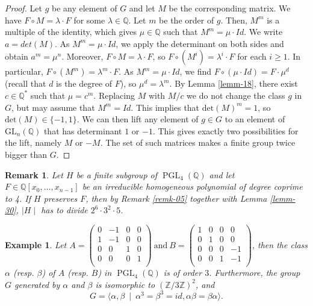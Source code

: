 \documentclass[leqno,12pt]{amsart} %
\newtheorem{rmk}[thm]{Remark}
\newtheorem{ex}[thm]{Example}
\newcommand{\Z}{\ensuremath{\mathbb{Z}}}
\newcommand{\Q}{\ensuremath{\mathbb{Q} }}
\DeclareMathOperator{\PGL}{PGL}
\begin{document}
\begin{proof}
     Let $g$ be any element of $G$ and let $M$ be the corresponding matrix. We have $F\circ M=\lambda\cdot F$ for some  $\lambda\in\Q $. Let $m$ be the order of $g$. Then, $M^m$ is a multiple of the identity, which gives $\mu\in\Q $ such that $M^m=\mu\cdot Id$. We write $a=det(M)$. As $M^m=\mu\cdot Id$, we apply the determinant on both sides and obtain $a^m=\mu^n$. Moreover, $F \circ M=\lambda\cdot F$, so $F\circ (M^i)=\lambda^i \cdot F$ for each $i\ge  1$. In particular, $F\circ (M^m)=\lambda^m\cdot F$. As $M^m=\mu\cdot Id$, we find $F\circ (\mu\cdot Id)=F\cdot\mu^d $ (recall that $d$ is the degree of $F$), so $\mu^d=\lambda^m$. By Lemma \ref{lemm-18}, there exist $c\in\Q^*$ such that $\mu=c^m$. Replacing $M$ with $M/c$ we do not change the class $g$ in $G$, but may assume that $M^m=Id$. This implies that $\mathrm{det}(M)^m=1$, so $\mathrm{det}(M)\in \{-1,1\}$. We can then lift any element of $g \in G$ to an element of $\mathrm{GL}_n(\Q )$ that has determinant $ 1$ or $-1$. This gives exactly two possibilities for the lift, namely $M$ or $-M$. The set of such matrices makes a finite group twice bigger than $G$. 
\end{proof}
\begin{rmk}\label{remk-02} 
 Let $H$ be a finite subgroup of $\PGL _{4}(\Q )$ and let $F\in \Q [x_0,\ldots ,x_{n-1}]$ be an irreducible homogeneous polynomial of degree coprime to 4. If $H$ preserves $F$, then by Remark \ref{remk-05} together with Lemma \ref{lemm-30}, $\mid H\mid $ has to divide $2^6\cdot 3^2\cdot5$.
\end{rmk}
 
\begin{ex}\label{ex-01}
    Let $A=\left(\begin{matrix}
       0&-1 &0&0 \\
         1& -1 &0&0 \\
0& 0 &1&0 \\
0& 0 &0&1 \\
    \end{matrix}\right) \mathrm{~and~}B=\left(\begin{matrix}
       1&0 &0&0 \\
         0& 1 &0&0 \\
          0& 0 &0&-1 \\
          0& 0 &1&-1 \\ 
    \end{matrix}\right)$, then the class $\alpha$ (resp. $\beta$) of $A$ (resp. $B$) in $\PGL_4(\Q)$ is of order $3$. Furthermore, the group $G$ generated by $\alpha$ and $\beta$ is isomorphic to $(\Z/3\Z)^2$, and
 \[G=\langle\alpha,\beta~\mid ~\alpha^3=\beta^3=id,\alpha\beta=\beta\alpha\rangle.\]
\end{ex}
 
\end{document}
